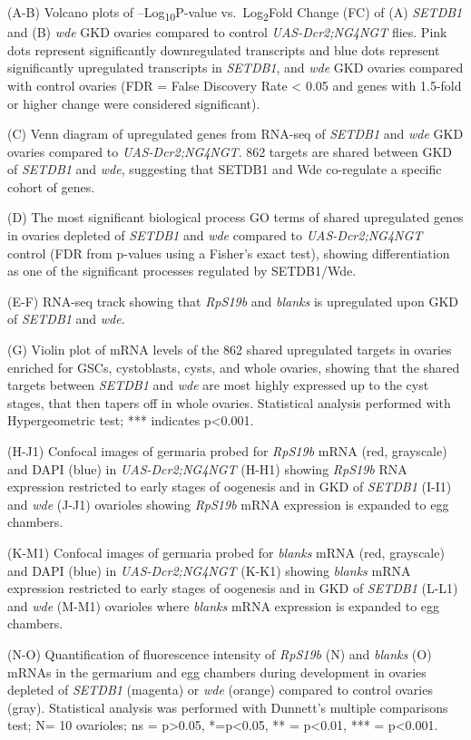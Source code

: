 \documentclass[12pt,oneside]{reedthesis}
\begin{document}
(A-B) Volcano plots of --Log\textsubscript{10}P-value vs.~Log\textsubscript{2}Fold Change (FC) of
(A) \emph{SETDB1} and (B) \emph{wde} GKD ovaries compared to control
\emph{UAS-Dcr2;NG4NGT} flies. Pink dots represent significantly downregulated
transcripts and blue dots represent significantly upregulated
transcripts in \emph{SETDB1}, and \emph{wde} GKD ovaries compared with control
ovaries (FDR = False Discovery Rate \textless{} 0.05 and genes with 1.5-fold or
higher change were considered significant).

(C) Venn diagram of upregulated genes from RNA-seq of \emph{SETDB1} and \emph{wde}
GKD ovaries compared to \emph{UAS-Dcr2;NG4NGT}. 862 targets are shared
between GKD of \emph{SETDB1} and \emph{wde}, suggesting that SETDB1 and Wde
co-regulate a specific cohort of genes.

(D) The most significant biological process GO terms of shared
upregulated genes in ovaries depleted of \emph{SETDB1} and \emph{wde} compared to
\emph{UAS-Dcr2;NG4NGT} control (FDR from p-values using a Fisher's exact
test), showing differentiation as one of the significant processes
regulated by SETDB1/Wde.

(E-F) RNA-seq track showing that \emph{RpS19b} and \emph{blanks} is upregulated
upon GKD of \emph{SETDB1} and \emph{wde}.

(G) Violin plot of mRNA levels of the 862 shared upregulated targets in
ovaries enriched for GSCs, cystoblasts, cysts, and whole ovaries,
showing that the shared targets between \emph{SETDB1} and \emph{wde} are most
highly expressed up to the cyst stages, that then tapers off in whole
ovaries. Statistical analysis performed with Hypergeometric test; ***
indicates p\textless0.001.

(H-J1) Confocal images of germaria probed for \emph{RpS19b} mRNA (red,
grayscale) and DAPI (blue) in \emph{UAS-Dcr2;NG4NGT} (H-H1) showing \emph{RpS19b}
RNA expression restricted to early stages of oogenesis and in GKD of
\emph{SETDB1} (I-I1) and \emph{wde} (J-J1) ovarioles showing \emph{RpS19b} mRNA
expression is expanded to egg chambers.

(K-M1) Confocal images of germaria probed for \emph{blanks} mRNA (red,
grayscale) and DAPI (blue) in \emph{UAS-Dcr2;NG4NGT} (K-K1) showing \emph{blanks}
mRNA expression restricted to early stages of oogenesis and in GKD of
\emph{SETDB1} (L-L1) and \emph{wde} (M-M1) ovarioles where \emph{blanks} mRNA
expression is expanded to egg chambers.

(N-O) Quantification of fluorescence intensity of \emph{RpS19b} (N) and
\emph{blanks} (O) mRNAs in the germarium and egg chambers during development
in ovaries depleted of \emph{SETDB1} (magenta) or \emph{wde} (orange) compared to
control ovaries (gray). Statistical analysis was performed with
Dunnett's multiple comparisons test; N= 10 ovarioles; ns = p\textgreater0.05,
*=p\textless0.05, ** = p\textless0.01, *** = p\textless0.001.
\end{document}
